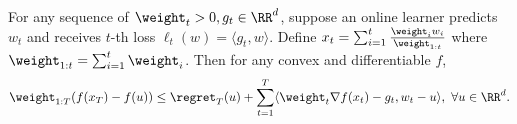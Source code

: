 \begin{lemma}
\label{lem:DP-OTB:basic-lemma}
For any sequence of $\weight_t>0, g_t\in\RR^d$, suppose an online learner predicts $w_t$ and receives $t$-th loss $\ell_t(w)=\langle g_t,w\rangle$. Define $x_t=\sum_{i=1}^t \frac{\weight_iw_i}{\weight_{1:t}}$ where $\weight_{1:t}=\sum_{i=1}^t\weight_i$. Then for any convex and differentiable $f$,
\begin{align*}
    \weight_{1:T}(f(x_T)-f(u)) \leq \regret_T(u) + \sum_{t=1}^T \langle \weight_t\nabla f(x_t) - g_t, w_t-u\rangle, \ \forall u\in \RR^d.
\end{align*}
\end{lemma}